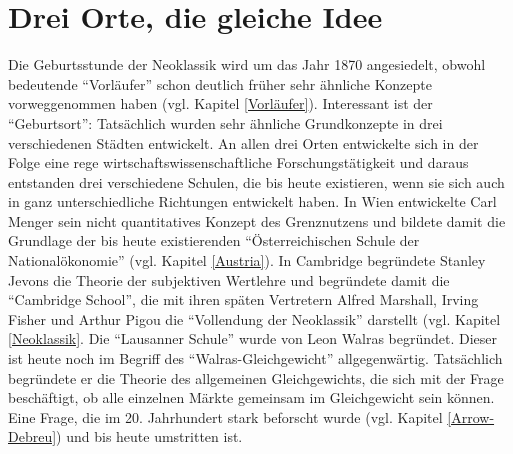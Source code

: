 %
%
%

\chapter{Drei Orte, die gleiche Idee}
\label{Marginalismus}

Die Geburtsstunde der Neoklassik wird um das Jahr 1870 angesiedelt, obwohl bedeutende "`Vorläufer"' schon deutlich früher sehr ähnliche Konzepte vorweggenommen haben (vgl. Kapitel \ref{Vorläufer}). Interessant ist der "`Geburtsort"': Tatsächlich wurden sehr ähnliche Grundkonzepte in drei verschiedenen Städten entwickelt. An allen drei Orten entwickelte sich in der Folge eine rege wirtschaftswissenschaftliche Forschungstätigkeit und daraus entstanden drei verschiedene Schulen, die bis heute existieren, wenn sie sich auch in ganz unterschiedliche Richtungen entwickelt haben. In Wien entwickelte Carl Menger sein nicht quantitatives Konzept des Grenznutzens und bildete damit die Grundlage der bis heute existierenden "`Österreichischen Schule der Nationalökonomie"' (vgl. Kapitel \ref{Austria}). In Cambridge begründete Stanley Jevons die Theorie der subjektiven Wertlehre und begründete damit die "`Cambridge School"', die mit ihren späten Vertretern Alfred Marshall, Irving Fisher und Arthur Pigou die "`Vollendung der Neoklassik"' darstellt (vgl. Kapitel \ref{Neoklassik}. Die "`Lausanner Schule"' wurde von Leon Walras begründet. Dieser ist heute noch im Begriff des "`Walras-Gleichgewicht"' allgegenwärtig. Tatsächlich begründete er die Theorie des allgemeinen Gleichgewichts, die sich mit der Frage beschäftigt, ob alle einzelnen Märkte gemeinsam im Gleichgewicht sein können. Eine Frage, die im 20. Jahrhundert stark beforscht wurde (vgl. Kapitel \ref{Arrow-Debreu}) und bis heute umstritten ist.

